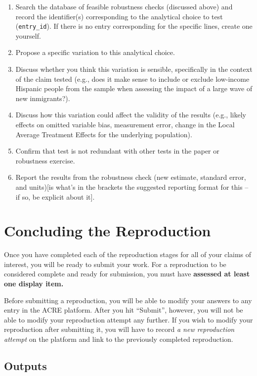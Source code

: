 \documentclass[]{book}
\begin{document}
\begin{enumerate}
\def\labelenumi{\arabic{enumi}.}
\item
  Search the database of feasible robustness checks (discussed above) and record the identifier(s) corresponding to the analytical choice to test (\texttt{entry\_id}). If there is no entry corresponding for the specific lines, create one yourself.
\item
  Propose a specific variation to this analytical choice.
\item
  Discuss whether you think this variation is sensible, specifically in the context of the claim tested (e.g., does it make sense to include or exclude low-income Hispanic people from the sample when assessing the impact of a large wave of new inmigrants?).
\item
  Discuss how this variation could affect the validity of the results (e.g., likely effects on omitted variable bias, measurement error, change in the Local Average Treatment Effects for the underlying population).
\item
  Confirm that test is not redundant with other tests in the paper or robustness exercise.
\item
  Report the results from the robustness check (new estimate, standard error, and units){[}is what's in the brackets the suggested reporting format for this -- if so, be explicit about it{]}.
\end{enumerate}

\hypertarget{concluding-the-reproduction}{%
\chapter{Concluding the Reproduction}\label{concluding-the-reproduction}}

Once you have completed each of the reproduction stages for all of your claims of interest, you will be ready to submit your work. For a reproduction to be considered complete and ready for submission, you must have \textbf{assessed at least one display item.}

Before submitting a reproduction, you will be able to modify your answers to any entry in the ACRE platform. After you hit ``Submit'', however, you will not be able to modify your reproduction attempt any further. If you wish to modify your reproduction after submitting it, you will have to record \emph{a new reproduction attempt} on the platform and link to the previously completed reproduction.

\hypertarget{outputs}{%
\section{Outputs}\label{outputs}}
\end{document}
